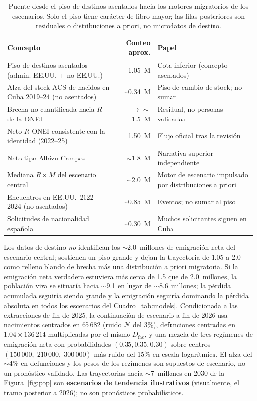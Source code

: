 \documentclass[11pt,a4paper]{article}
\begin{document}
\begin{table}[ht]
\centering
\caption{Puente desde el piso de destinos asentados hacia los motores migratorios de los escenarios.
Solo el piso tiene carácter de libro mayor; las filas posteriores son residuales o distribuciones a priori, no microdatos de destino.}
\label{tab:bridge}
\begin{tabular}{lrl}
\toprule
Concepto & Conteo aprox. & Papel \\
\midrule
Piso de destinos asentados (admin. EE.UU. + no EE.UU.) & 1.05~M & Cota inferior (concepto asentados) \\
Alza del stock ACS de nacidos en Cuba 2019--24 (no asentados) & $\sim$0.34~M & Piso de cambio de stock; no sumar \\
Brecha no cuantificada hacia $R$ de la ONEI & $\to\sim$1.5~M & Residual, no personas validadas \\
Neto $R$ ONEI consistente con la identidad (2022--25) & 1.50~M & Flujo oficial tras la revisión \\
Neto tipo Albizu-Campos & $\sim$1.8~M & Narrativa superior independiente \\
Mediana $R\times M$ del escenario central & $\sim$2.0~M & Motor de escenario impulsado por distribuciones a priori \\
Encuentros en EE.UU.\ 2022--2024 (no asentados) & $\sim$0.85~M & Eventos; no sumar al piso \\
Solicitudes de nacionalidad española & $\sim$0.30~M & Muchos solicitantes siguen en Cuba \\
\bottomrule
\end{tabular}
\end{table}

Los datos de destino \emph{no} identifican los $\sim$2.0~millones de emigración neta del escenario central; sostienen un piso grande y dejan la trayectoria de 1.05 a 2.0 como relleno blando de brecha más una distribución a priori migratoria.
Si la emigración neta verdadera estuviera más cerca de 1.5 que de 2.0~millones, la población viva se situaría hacia $\sim$9.1 en lugar de $\sim$8.6~millones; la pérdida acumulada seguiría siendo grande y la emigración seguiría dominando la pérdida absoluta en todos los escenarios del Cuadro~\ref{tab:models}.
Condicionada a las extracciones de fin de 2025, la continuación de escenario a fin de 2026 usa nacimientos centrados en 65\,682 (ruido $\mathcal{N}$ del 3\%),
defunciones centradas en $1.04\times 136\,214$ multiplicadas por el mismo $D_{\mathrm{fac}}$,
y una mezcla de tres regímenes de emigración neta con probabilidades $(0.35,0.35,0.30)$ sobre centros $(150\,000,\;210\,000,\;300\,000)$ más ruido del 15\% en escala logarítmica.
El alza del $\sim$4\% en defunciones y los pesos de los regímenes son supuestos de escenario, no un pronóstico validado.
Las trayectorias hacia $\sim$7~millones en 2030 de la Figura~\ref{fig:pop} son \textbf{escenarios de tendencia ilustrativos} (visualmente, el tramo posterior a 2026); no son pronósticos probabilísticos.
\end{document}
